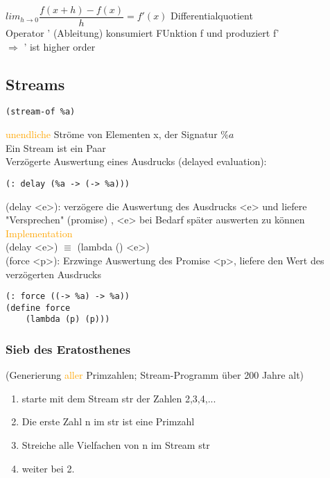 \documentclass[paper=a4, fontsize=11pt]{scrartcl}
\numberwithin{equation}{section}
\numberwithin{figure}{section}
\numberwithin{table}{section}
\begin{document}
\begin{lstlistig}
$lim_{h \rightarrow 0} \dfrac{f(x+h)-f(x)}{h} = f'(x)$ Differentialquotient \\

Operator ' (Ableitung) konsumiert FUnktion f und produziert f' \\
$\Rightarrow$ ' ist higher order \\
\subsection{Streams}
\begin{lstlisting}
(stream-of %a)
\end{lstlisting}
\textcolor{orange}{unendliche} Ströme von Elementen x, der Signatur $\%a$ \\
Ein Stream ist ein Paar \\


Verzögerte Auswertung eines Ausdrucks (delayed evaluation):
\begin{lstlisting}
(: delay (%a -> (-> %a)))
\end{lstlisting}

(delay <e>): verzögere die Auswertung des Ausdrucks <e> und liefere "Versprechen" (promise) , <e>  bei Bedarf später auswerten zu können \\
\textcolor{orange}{Implementation}\\
(delay <e>) $\equiv$ (lambda () <e>) \\
(force <p>): Erzwinge Auswertung des Promise <p>, liefere den Wert des verzögerten Ausdrucks \\

\begin{lstlisting}
(: force ((-> %a) -> %a))
(define force
    (lambda (p) (p)))
\end{lstlisting}

\subsubsection{Sieb des Eratosthenes}
(Generierung \textcolor{orange}{aller} Primzahlen; Stream-Programm über 200 Jahre alt) \\
\begin{enumerate}
\item starte mit dem Stream str der Zahlen 2,3,4,...
\item Die erste Zahl n im str ist eine Primzahl
\item Streiche alle Vielfachen von n im Stream str
\item weiter bei 2.
\end{enumerate}


\end{lstlistig}
\end{document}
